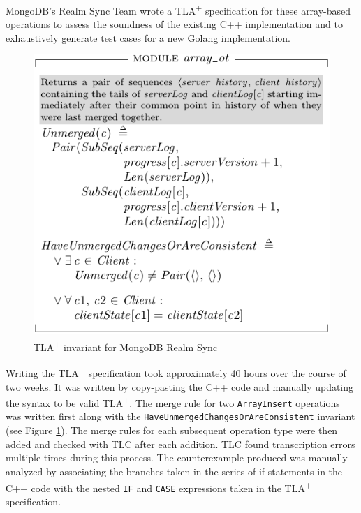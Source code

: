 \documentclass{vldb}
\begin{document}
MongoDB's Realm Sync Team wrote a TLA\textsuperscript{+} specification for these array-based operations to assess the soundness of the existing C++ implementation and to exhaustively generate test cases for a new Golang implementation.



\begin{figure}
\includegraphics{array_ot_invariant.pdf}
\caption{TLA\textsuperscript{+} invariant for MongoDB Realm Sync}
\label{fig:tlaplus_realm_sync_invariant}
\end{figure}

Writing the TLA\textsuperscript{+} specification took approximately 40 hours over the course of two weeks. It was written by copy-pasting the C++ code and manually updating the syntax to be valid TLA\textsuperscript{+}. The merge rule for two \texttt{ArrayInsert} operations was written first along with the \texttt{HaveUnmergedChangesOrAreConsistent} invariant (see Figure \ref{fig:tlaplus_realm_sync_invariant}).
The merge rules for each subsequent operation type were then added and checked with TLC after each addition.
TLC found transcription errors multiple times during this process. The counterexample produced was manually analyzed by associating the branches taken in the series of if-statements in the C++ code with the nested \texttt{IF} and \texttt{CASE} expressions taken in the TLA\textsuperscript{+} specification.
\end{document}

